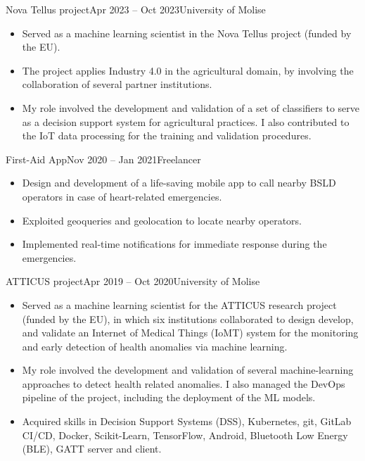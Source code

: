 		{Nova Tellus project}{Apr 2023 – Oct 2023}{University of Molise}{\footnotesize{} \hspace{1pt}
		}
	\begin{itemize}
            \item Served as a machine learning scientist in the Nova Tellus project (funded by the EU).
            \item The project applies Industry 4.0 in the agricultural domain, by involving the collaboration of several partner institutions.
            \item My role involved the development and validation of a set of classifiers to serve as a decision support system for agricultural practices. I also contributed to the IoT data processing for the training and validation procedures.
	\end{itemize}
	
	\medskip

		{First-Aid App}{Nov 2020 – Jan 2021}{Freelancer}{\footnotesize{} \hspace{1pt}
		}
	\begin{itemize}
            \item Design and development of a life-saving mobile app to call nearby BSLD operators in case of heart-related emergencies.
            \item Exploited geoqueries and geolocation to locate nearby operators.
            \item Implemented real-time notifications for immediate response during the emergencies.
	\end{itemize}
        	
	\medskip
	
		{ATTICUS project}{Apr 2019 – Oct 2020}{University of Molise}{\footnotesize{} \hspace{1pt}
		}
	\begin{itemize}
            \item Served as a machine learning scientist for the ATTICUS research project (funded by the EU), in which six institutions collaborated to design develop, and validate an Internet of Medical Things (IoMT) system for the monitoring and early detection of health anomalies via machine learning.
            \item My role involved the development and validation of several machine-learning approaches to detect health related anomalies. I also managed the DevOps pipeline of the project, including the deployment of the ML models.
            \item Acquired skills in Decision Support Systems (DSS), Kubernetes, git, GitLab CI/CD, Docker, Scikit-Learn, TensorFlow, Android, Bluetooth Low Energy (BLE), GATT server and client.
	\end{itemize}
